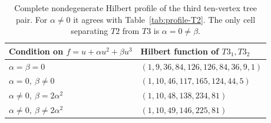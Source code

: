 \documentclass[reqno]{article}
\theoremstyle{plain} %
\theoremstyle{definition}
\theoremstyle{remark}
\numberwithin{equation}{section}
\begin{document}
\begin{table}[htbp]
\centering\renewcommand{\arraystretch}{1.17}
\begin{tabular}{ll}\toprule
Condition on $f=u+\alpha u^2+\beta u^3$&Hilbert function of $T3_1,T3_2$\\\midrule
$\alpha=\beta=0$&$(1,9,36,84,126,126,84,36,9,1)$\\
$\alpha=0,\ \beta\ne0$&$(1,10,46,117,165,124,44,5)$\\
$\alpha\ne0,\ \beta=2\alpha^2$&$(1,10,48,138,234,81)$\\
$\alpha\ne0,\ \beta\ne2\alpha^2$&$(1,10,49,146,225,81)$\\\bottomrule
\end{tabular}
\caption{Complete nondegenerate Hilbert profile of the third ten-vertex tree pair. For
  $\alpha\ne0$ it agrees with Table~\ref{tab:profile-T2}. The only cell separating $T2$ from $T3$ is $\alpha=0\ne\beta$.}
\label{tab:profile-T3}
\end{table}
\end{document}
